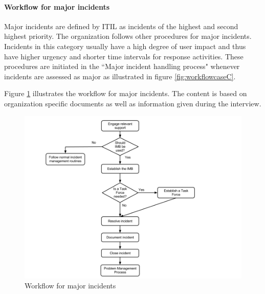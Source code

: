 \paragraph{Workflow for major incidents}
Major incidents are defined by ITIL as incidents of the highest and second highest priority. The organization follows other procedures for major incidents. Incidents in this category usually have a high degree of user impact and thus have higher urgency and shorter time intervals for response activities. These procedures are initiated in the ``Major incident handling process" whenever incidents are assessed as major as illustrated in figure \ref{fig:workflowcaseC}.  

Figure \ref{fig:workflowcaseCmajor} illustrates the workflow for major incidents. The content is based on organization specific documents as well as information given during the interview.

\begin{figure}[H]
\hspace{-1.1cm}\includegraphics[scale=0.53]{WorkflowcaseCMAJOR.png}
\caption[Workflow for major incidents, Case C]{Workflow for major incidents}
\label{fig:workflowcaseCmajor}
\end{figure}

